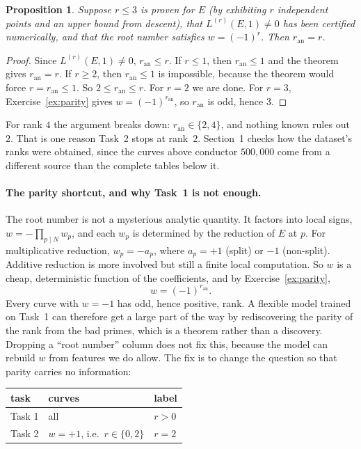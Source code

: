 \documentclass[11pt]{article}
\theoremstyle{definition}
\theoremstyle{plain}
\newtheorem{proposition}[definition]{Proposition}
\theoremstyle{remark}
\renewcommand{\_}{\oldunderscore\allowbreak}
\begin{document}
\begin{proposition}\label{prop:labels}
Suppose $r\le3$ is proven for $E$ (by exhibiting $r$ independent points and an upper bound
from descent), that $L^{(r)}(E,1)\ne0$ has been certified numerically, and that the root
number satisfies $w=(-1)^r$. Then $r_{\mathrm{an}}=r$.
\end{proposition}

\begin{proof}
Since $L^{(r)}(E,1)\neq0$, $r_{\mathrm{an}}\le r$. If $r\le1$, then $r_{\mathrm{an}}\le1$ and the
theorem gives $r_{\mathrm{an}}=r$. If $r\ge2$, then $r_{\mathrm{an}}\le1$ is impossible, because the
theorem would force $r=r_{\mathrm{an}}\le1$. So $2\le r_{\mathrm{an}}\le r$. For $r=2$ we are done.
For $r=3$, Exercise~\ref{ex:parity} gives $w=(-1)^{r_{\mathrm{an}}}$, so $r_{\mathrm{an}}$ is odd, hence $3$.
\end{proof}

\noindent For rank $4$ the argument breaks down: $r_{\mathrm{an}}\in\{2,4\}$, and nothing known
rules out $2$. That is one reason Task~2 stops at rank~$2$. Section~1 checks how the
dataset's ranks were obtained, since the curves above conductor $500{,}000$ come from a
different source than the complete tables below it.

\paragraph{The parity shortcut, and why Task~1 is not enough.}
The root number is not a mysterious analytic quantity. It factors into local signs,
$w=-\prod_{p\mid N}w_p$, and each $w_p$ is determined by the reduction of $E$ at $p$. For
multiplicative reduction, $w_p=-a_p$, where $a_p=+1$ (split) or $-1$ (non-split). Additive
reduction is more involved but still a finite local computation. So $w$ is a cheap,
deterministic function of the coefficients, and by Exercise~\ref{ex:parity},
\[
  w=(-1)^{r_{\mathrm{an}}}.
\]
Every curve with $w=-1$ has odd, hence positive, rank. A flexible model trained on Task~1
can therefore get a large part of the way by rediscovering the parity of the rank from the bad
primes, which is a theorem rather than a discovery. Dropping a ``root number'' column does not
fix this, because the model can rebuild $w$ from features we do allow. The fix is to change the
question so that parity carries no information:

\begin{center}\small
\begin{tabular}{@{}lll@{}}
\toprule
task & curves & label\\\midrule
Task 1 & all & $r>0$\\
Task 2 & $w=+1$, i.e.\ $r\in\{0,2\}$ & $r=2$\\\bottomrule
\end{tabular}
\end{center}
\end{document}
